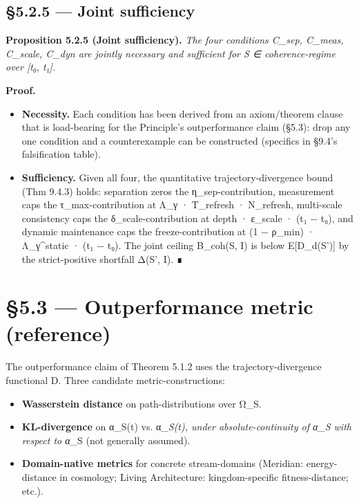 \documentclass[11pt, openany]{book}
\newcommand{\sectionbreak}{\clearpage}
\begin{document}
\subsection{§5.2.5 --- Joint sufficiency}

\textbf{Proposition 5.2.5 (Joint sufficiency).} \textit{The four conditions C\_\allowbreak{}sep, C\_\allowbreak{}meas, C\_\allowbreak{}scale, C\_\allowbreak{}dyn are jointly necessary and sufficient for S ∈ coherence-regime over [t₀, t₁].}

\textbf{Proof.}
\begin{itemize}
\item \textbf{Necessity.} Each condition has been derived from an axiom/theorem clause that is load-bearing for the Principle's outperformance claim (§5.3): drop any one condition and a counterexample can be constructed (specifics in §9.4's falsification table).
\item \textbf{Sufficiency.} Given all four, the quantitative trajectory-divergence bound (Thm 9.4.3) holds: separation zeros the η\_\allowbreak{}sep-contribution, measurement caps the τ\_\allowbreak{}max-contribution at Λ\_\allowbreak{}γ · T\_\allowbreak{}refresh · N\_\allowbreak{}refresh, multi-scale consistency caps the δ\_\allowbreak{}scale-contribution at depth · ε\_\allowbreak{}scale · (t₁ − t₀), and dynamic maintenance caps the freeze-contribution at (1 − ρ\_\allowbreak{}min) · Λ\_\allowbreak{}γ\textasciicircum{}static · (t₁ − t₀). The joint ceiling B\_\allowbreak{}coh(S, I) is below E[D\_\allowbreak{}d(S')] by the strict-positive shortfall Δ(S', I). ∎
\end{itemize}

\sectionbreak

\section{§5.3 --- Outperformance metric (reference)}

The outperformance claim of Theorem 5.1.2 uses the trajectory-divergence functional D. Three candidate metric-constructions:

\begin{itemize}
\item \textbf{Wasserstein distance} on path-distributions over Ω\_\allowbreak{}S.
\item \textbf{KL-divergence} on α\_\allowbreak{}S(t) vs. α\textit{\_\allowbreak{}S(t), under absolute-continuity of α\_\allowbreak{}S with respect to α}\_\allowbreak{}S (not generally assumed).
\item \textbf{Domain-native metrics} for concrete stream-domains (Meridian: energy-distance in cosmology; Living Architecture: kingdom-specific fitness-distance; etc.).
\end{itemize}
\end{document}
